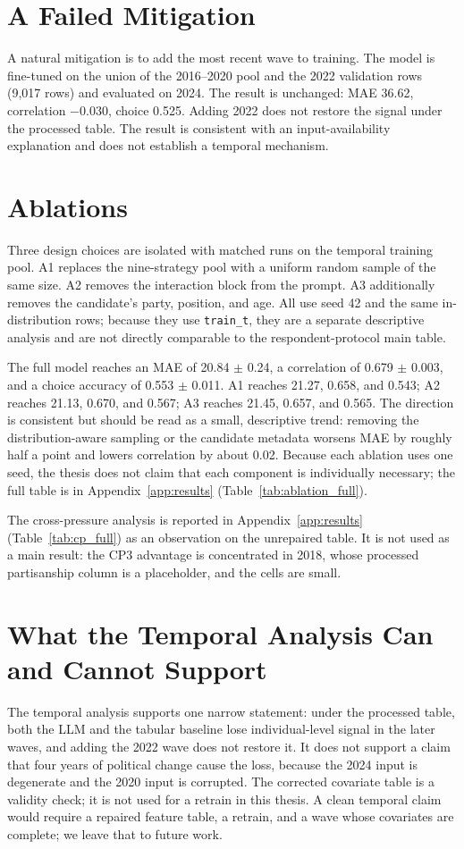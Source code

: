 \section{A Failed Mitigation}

A natural mitigation is to add the most recent wave to training. The model is
fine-tuned on the union of the 2016--2020 pool and the 2022 validation rows
(9,017 rows) and evaluated on 2024. The result is unchanged: MAE 36.62,
correlation $-0.030$, choice 0.525. Adding 2022 does not restore the signal
under the processed table. The result is consistent with an input-availability
explanation and does not establish a temporal mechanism.

\section{Ablations}

Three design choices are isolated with matched runs on the temporal training
pool. A1 replaces the nine-strategy pool with a uniform random sample of the
same size. A2 removes the interaction block from the prompt. A3 additionally
removes the candidate's party, position, and age. All use seed 42 and the same
in-distribution rows; because they use \texttt{train\_t}, they are a separate
descriptive analysis and are not directly comparable to the respondent-protocol
main table.

The full model reaches an MAE of 20.84 $\pm$ 0.24, a correlation of 0.679
$\pm$ 0.003, and a choice accuracy of 0.553 $\pm$ 0.011. A1 reaches 21.27, 0.658,
and 0.543; A2 reaches 21.13, 0.670, and 0.567; A3 reaches 21.45, 0.657, and
0.565. The direction is consistent but should be read as a small, descriptive
trend: removing the distribution-aware sampling or the candidate metadata worsens
MAE by roughly half a point and lowers correlation by about 0.02. Because each
ablation uses one seed, the thesis does not claim that each component is
individually necessary; the full table is in Appendix~\ref{app:results}
(Table~\ref{tab:ablation_full}).

The cross-pressure analysis is reported in Appendix~\ref{app:results}
(Table~\ref{tab:cp_full}) as an observation on the unrepaired table. It is not used as a main result: the CP3
advantage is concentrated in 2018, whose processed partisanship column is a
placeholder, and the cells are small.

\section{What the Temporal Analysis Can and Cannot Support}

The temporal analysis supports one narrow statement: under the processed table,
both the LLM and the tabular baseline lose individual-level signal in the later
waves, and adding the 2022 wave does not restore it. It does not support a claim
that four years of political change cause the loss, because the 2024 input is
degenerate and the 2020 input is corrupted. The corrected covariate table is a
validity check; it is not used for a retrain in this thesis. A clean temporal
claim would require a repaired feature table, a retrain, and a wave whose
covariates are complete; we leave that to future work.
